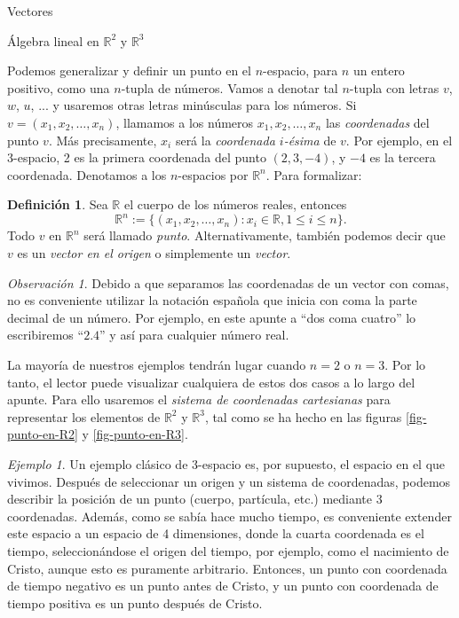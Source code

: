 \documentclass[a4paper,12pt,twoside,spanish,reqno]{amsbook}
\numberwithin{equation}{section}
\theoremstyle{definition}
\newtheorem{definicion}[teorema]{Definici\'on}
\theoremstyle{remark}
\newtheorem*{ejemplo*}{Ejemplo}
\newtheorem*{obs*}{Observaci\'on}
\newcommand{\R}{\mathbb R}
\begin{document}
\begin{chapter}{Vectores}
\begin{section}{Álgebra lineal en $\R^2$ y $\R^3$}
    
        Podemos generalizar y definir un punto en el $n$-espacio, para $n$ un entero positivo, como una $n$-tupla de números. Vamos a denotar tal $n$-tupla con letras $v$, $w$, $u$, ... y usaremos otras letras minúsculas para los números. Si $v =(x_1,x_2,\ldots,x_n)$, llamamos a los números $x_1,x_2,\ldots,x_n$ las \textit{coordenadas} del punto $v$. Más precisamente, $x_i$ será la \textit{coordenada $i$-ésima} de $v$. Por ejemplo, en el 3-espacio, 2 es la primera coordenada del punto $(2,3, -4)$, y $-4$ es la tercera coordenada. Denotamos a los  $n$-espacios por $\R^n$. Para formalizar:
        \begin{definicion}
            Sea $\R$ el cuerpo de los números reales,  entonces
            \begin{equation*}
                \R^n:= \{(x_1,x_2,\ldots,x_n): x_i \in \R, 1 \le i \le n \}.
            \end{equation*}
            Todo $v$ en $\R^n$ será llamado {\em punto}. Alternativamente, también podemos decir que $v$  es un \textit{vector en el origen} o simplemente un \textit{vector}. 

        \end{definicion}
        
        \begin{obs*} Debido  a que separamos las coordenadas de un vector con comas, no es conveniente utilizar la notación española que inicia con coma la parte decimal de un número. Por ejemplo,  en este apunte  a ``dos coma cuatro'' lo escribiremos ``$2.4$'' y así para cualquier número real.  
        \end{obs*}

        La mayoría de nuestros ejemplos tendrán lugar cuando $n = 2$ o $n = 3$. Por lo tanto, el lector puede visualizar cualquiera de estos dos casos a lo largo del apunte. Para ello usaremos el {\em sistema  de coordenadas cartesianas} para representar los elementos de  $\R^2$ y  $\R^3$, tal como se ha hecho en las figuras \ref{fig-punto-en-R2} y \ref{fig-punto-en-R3}.
        
    
    
        \begin{ejemplo*} \label{ej-3espacio-industria}
            Un ejemplo clásico de 3-espacio es, por supuesto, el espacio en el que vivimos. Después de seleccionar un origen y un sistema de coordenadas, podemos describir la posición de un punto (cuerpo, partícula, etc.) mediante 3 coordenadas. Además, como se sabía hace mucho tiempo, es conveniente extender este espacio a un espacio de 4 dimensiones, donde la cuarta coordenada es el tiempo, seleccionándose el origen del tiempo, por ejemplo, como el nacimiento de Cristo, aunque esto es puramente arbitrario. Entonces, un punto con coordenada de tiempo negativo es un punto antes de Cristo, y un punto con coordenada  de tiempo positiva es un punto después de Cristo.
            

\end{ejemplo*}
\end{section}
\end{chapter}
\end{document}
